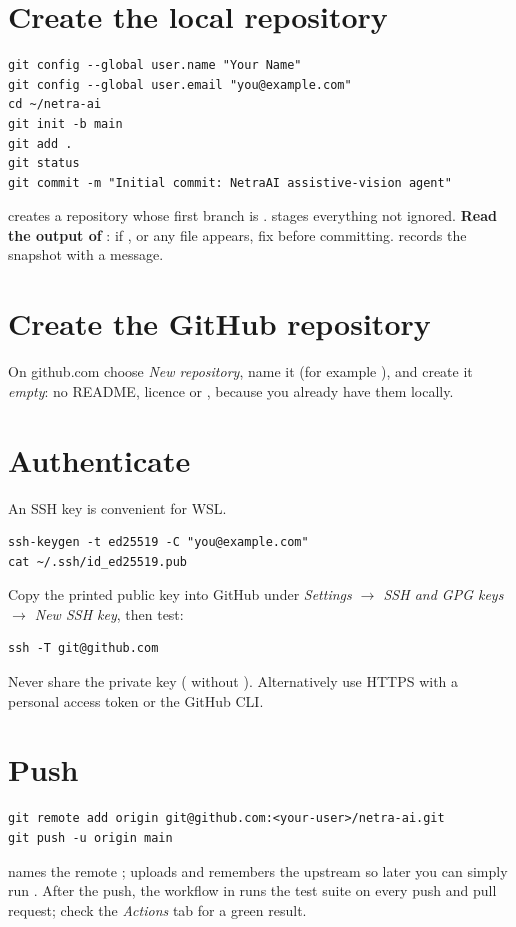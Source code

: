 \section{Create the local repository}
\begin{lstlisting}[style=sh]
git config --global user.name "Your Name"
git config --global user.email "you@example.com"
cd ~/netra-ai
git init -b main
git add .
git status
git commit -m "Initial commit: NetraAI assistive-vision agent"
\end{lstlisting}
 creates a repository whose first branch is .  stages everything not ignored. \textbf{Read the output of }: if ,  or any  file appears, fix  before committing.  records the snapshot with a message.

\section{Create the GitHub repository}
On github.com choose \emph{New repository}, name it (for example ), and create it \emph{empty}: no README, licence or , because you already have them locally.

\section{Authenticate}
An SSH key is convenient for WSL.
\begin{lstlisting}[style=sh]
ssh-keygen -t ed25519 -C "you@example.com"
cat ~/.ssh/id_ed25519.pub
\end{lstlisting}
Copy the printed public key into GitHub under \emph{Settings $\rightarrow$ SSH and GPG keys $\rightarrow$ New SSH key}, then test:
\begin{lstlisting}[style=sh]
ssh -T git@github.com
\end{lstlisting}
Never share the private key ( without ). Alternatively use HTTPS with a personal access token or the GitHub CLI.

\section{Push}
\begin{lstlisting}[style=sh]
git remote add origin git@github.com:<your-user>/netra-ai.git
git push -u origin main
\end{lstlisting}
 names the remote ;  uploads  and remembers the upstream so later you can simply run . After the push, the workflow in  runs the test suite on every push and pull request; check the \emph{Actions} tab for a green result.

